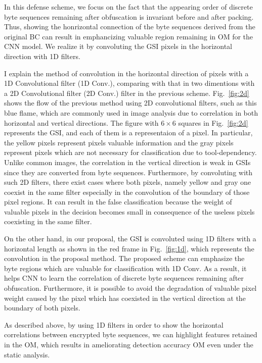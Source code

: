 \documentclass{ieeeaccess}
\newcommand{\myfigurename}{Fig.}
\begin{document}
In this defense scheme, we focus on the fact that the appearing order of discrete byte sequences remaining after obfuscation is invariant before and after packing.
Thus, showing the honrizontal connection of the byte sequences derived from the original BC can result in emphancizing valuable region remaining in OM for the CNN model.
We realize it by convoluting the GSI pixels in the horizontal direction with 1D filters.

I explain the method of convolution in the horizontal direction of pixels with a 1D Convolutional filter (1D Conv.), comparing with that in two dimentions with a 2D Convolutional filter (2D Conv.) filter in the previous scheme.
\myfigurename~\ref{fig:2d} shows the flow of the previous method using 2D convolutional filters, such as this blue flame, which are commonly used in image analysis due to correlation in both horizontal and vertical directions.
The figure with $6 \times 6$ squares in \myfigurename~\ref{fig:2d} represents the GSI, and each of them is a representaion of a pixel.
In particular, the yellow pixels represent pixels valuable information and the gray pixels represent pixels which are not necessary for classification due to tool-dependency.
Unlike common images, the correlation in the vertical direction is weak in GSIs since they are converted from byte sequences.
Furthermore, by convoluting with such 2D filters, there exist cases where both pixels, namely yellow and gray one coexist in the same filter especially in the convolution of the boundary of those pixel regions.
It can result in the false classification because the weight of valuable pixels in the decision becomes small in consequence of the useless pixels coexisting in the same filter.

On the other hand, in our proposal, the GSI is convoluted using 1D filters with a horizontal length as shown in the red frame in \myfigurename~\ref{fig:1d}, which represents the convolution in the proposal method.
The proposed scheme can emphasize the byte regions which are valuable for classification with 1D Conv.
As a result, it helps CNN to learn the correlation of discrete byte sequences remaining after obfuscation.
Furthermore, it is possible to avoid the degradation of valuable pixel weight caused by the pixel which has coexisted in the vertical direction at the boundary of both pixels.

As described above, by using 1D filters in order to show the horizontal correlations between encrypted byte sequences, we can highlight features retained in the OM, which results in ameliorating detection accuracy OM even under the static analysis.
\end{document}
